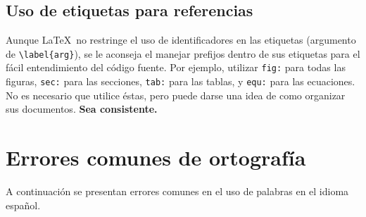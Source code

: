 \documentclass[twocolumn,11pts]{IEEEtran}
\begin{document}
\subsection{Uso de etiquetas para referencias}
Aunque \LaTeX\ no restringe el uso de identificadores en las etiquetas (argumento de \verb|\label{arg}|), se le aconseja el manejar prefijos dentro de sus etiquetas para el fácil entendimiento del código fuente. Por ejemplo, utilizar \texttt{fig:} para todas las figuras, \texttt{sec:} para las secciones, \texttt{tab:} para las tablas, y \texttt{equ:} para las ecuaciones. No es necesario que utilice éstas, pero puede darse una idea de como organizar sus documentos. \textbf{Sea consistente.}

\section{Errores comunes de ortografía}
A continuación se presentan errores comunes en el uso de palabras en el idioma español.
\end{document}
